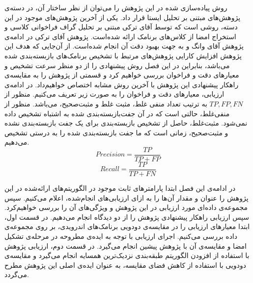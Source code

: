
\label{result}
روش پیاده‌سازی شده در این پژوهش را می‌توان از نظر ساختار آن، در دسته‌ی پژوهش‌های مبتنی بر تحلیل ایستا قرار داد. یکی از آخرین پژوهش‌های موجود در این دسته، روشی است که توسط آقای ترکی مبتنی بر تحلیل گراف فراخوانی کلاسی و استخراج امضا از کلاس‌های برنامک ارائه شده‌است. پژوهش آقای ترکی در ادامه‌ی پژوهش آقای وانگ و به جهت بهبود دقت آن انجام شده‌است. از آن‌جایی که هدف این پژوهش افزایش کارایی پژوهش‌های مرتبط با تشخیص برنامک‌های بازبسته‌بندی شده می‌باشد، بنابراین در این فصل روش پیشنهادی را از دو منظر سرعت تشخیص و معیار‌های دقت و فراخوان بررسی خواهیم کرد و قسمتی از پژوهش را به مقایسه‌ی راهکار پیشنهادی این پژوهش با آخرین روش مشابه اختصاص خواهیم‌داد. در ادامه‌ی ارزیابی، معیار‌های دقت و فراخوان را به صورت زیر تعریف می‌کنیم. منظور از $TP,FP,FN$ به ترتیب تعداد منفی‌ غلط، مثبت غلط و مثبت‌صحیح، می‌باشد. منظور از منفی‌غلط، حالتی است که در آن جفت‌بازبسته‌بندی شده به اشتباه تشخیص داده‌ نمی‌شود. مثبت‌غلط، حاصل از تشخیص بازبسته‌بندی برای یک جفت بازبسته‌بندی نشده و مثبت‌صحیح، زمانی است که ما جفت بازبسته‌بندی شده را به درستی تشخیص می‌دهیم.
\begin{equation}
	‫‪Precision‬‬	= \frac{TP}{TP+FP}
\end{equation}
\begin{equation}
		Recall = \frac{TP}{TP+FN}
\end{equation}

در ادامه‌ی این فصل ابتدا پارامتر‌های ثابت موجود در الگوریتم‌های ارائه‌شده در این پژوهش را عنوان و مقدار آن‌ها را به ازا‌ی ارزیابی‌های انجام‌شده، اعلام می‌کنیم. سپس مجموعه‌‌ی داده‌ای مورد ارزیابی در این پژوهش و ویژگی‌های آن را بررسی خواهیم‌کرد. سپس ارزیابی راهکار پیشنهادی پژوهش را از دو دیدگاه انجام می‌دهیم. در قسمت اول، ابتدا معیار‌های ارزیابی را در مقایسه‌ی دودویی برنامک‌های اندرویدی، بر روی مجموعه‌ی داده بررسی می‌کنیم. اجرای ارزیابی با توجه به ایده‌ی مطروحه در مرحله‌ی تشکیل امضا و مقایسه‌ی آن با پژوهش پیشین انجام می‌گیرد. در قسمت دوم، ارزیابی پژوهش با استفاده از افزودن الگوریتم‌ طبقه‌بندی نزدیک‌ترین همسایه انجام می‌گیرد و مقایسه‌ی دودویی با استفاده از کاهش فضای مقایسه‌، به عنوان ایده‌ی اصلی این پژوهش مطرح می‌گردد.

